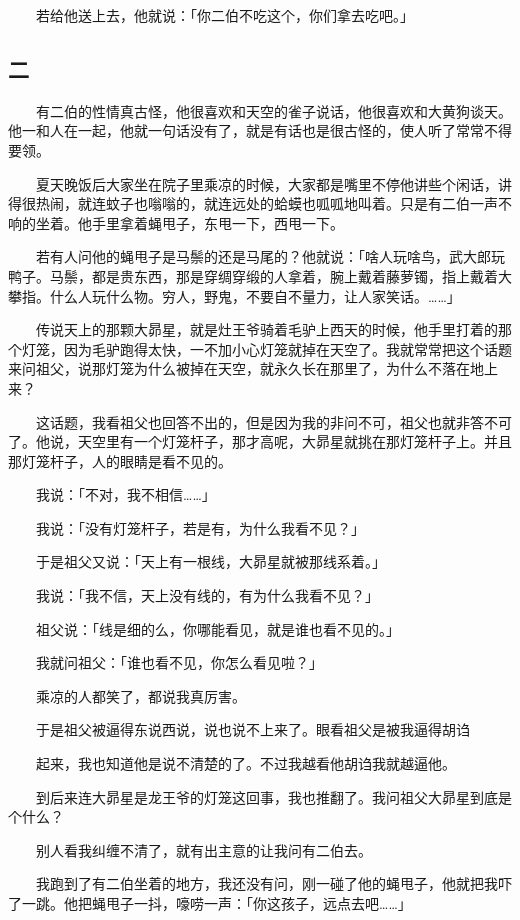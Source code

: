 \documentclass[UTF8]{ctexart}
\begin{document}
　　若给他送上去，他就说：「你二伯不吃这个，你们拿去吃吧。」

\subsection{二}

　　有二伯的性情真古怪，他很喜欢和天空的雀子说话，他很喜欢和大黄狗谈天。他一和人在一起，他就一句话没有了，就是有话也是很古怪的，使人听了常常不得要领。

　　夏天晚饭后大家坐在院子里乘凉的时候，大家都是嘴里不停他讲些个闲话，讲得很热闹，就连蚊子也嗡嗡的，就连远处的蛤蟆也呱呱地叫着。只是有二伯一声不响的坐着。他手里拿着蝇甩子，东甩一下，西甩一下。

　　若有人问他的蝇甩子是马鬃的还是马尾的？他就说：「啥人玩啥鸟，武大郎玩鸭子。马鬃，都是贵东西，那是穿绸穿缎的人拿着，腕上戴着藤萝镯，指上戴着大攀指。什么人玩什么物。穷人，野鬼，不要自不量力，让人家笑话。……」

　　传说天上的那颗大昴星，就是灶王爷骑着毛驴上西天的时候，他手里打着的那个灯笼，因为毛驴跑得太快，一不加小心灯笼就掉在天空了。我就常常把这个话题来问祖父，说那灯笼为什么被掉在天空，就永久长在那里了，为什么不落在地上来？

　　这话题，我看祖父也回答不出的，但是因为我的非问不可，祖父也就非答不可了。他说，天空里有一个灯笼杆子，那才高呢，大昴星就挑在那灯笼杆子上。并且那灯笼杆子，人的眼睛是看不见的。

　　我说：「不对，我不相信……」

　　我说：「没有灯笼杆子，若是有，为什么我看不见？」

　　于是祖父又说：「天上有一根线，大昴星就被那线系着。」

　　我说：「我不信，天上没有线的，有为什么我看不见？」

　　祖父说：「线是细的么，你哪能看见，就是谁也看不见的。」

　　我就问祖父：「谁也看不见，你怎么看见啦？」

　　乘凉的人都笑了，都说我真厉害。

　　于是祖父被逼得东说西说，说也说不上来了。眼看祖父是被我逼得胡诌

　　起来，我也知道他是说不清楚的了。不过我越看他胡诌我就越逼他。

　　到后来连大昴星是龙王爷的灯笼这回事，我也推翻了。我问祖父大昴星到底是个什么？

　　别人看我纠缠不清了，就有出主意的让我问有二伯去。

　　我跑到了有二伯坐着的地方，我还没有问，刚一碰了他的蝇甩子，他就把我吓了一跳。他把蝇甩子一抖，嚎唠一声：「你这孩子，远点去吧……」
\end{document}
